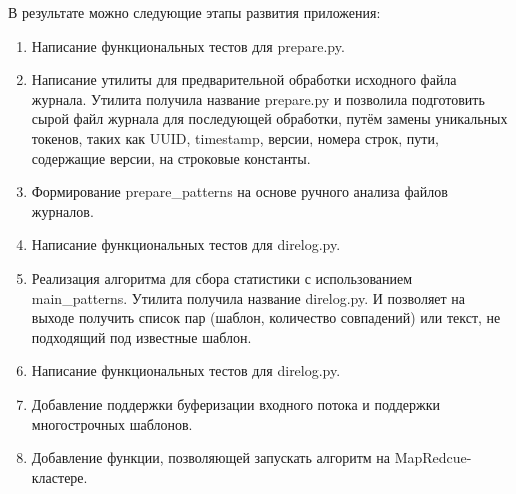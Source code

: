 В результате можно следующие этапы развития приложения:\\

\begin{enumerate}
\item Написание функциональных тестов для prepare.py.
\item Написание утилиты для предварительной обработки исходного файла журнала.
  Утилита получила название prepare.py и позволила подготовить сырой файл
  журнала для последующей обработки, путём замены уникальных токенов, таких
  как UUID, timestamp, версии, номера строк, пути, содержащие версии, на
  строковые константы.
\item Формирование prepare\_patterns на основе ручного анализа
  файлов журналов.
\item Написание функциональных тестов для direlog.py.
\item Реализация алгоритма для сбора статистики с использованием
  main\_patterns. Утилита получила название direlog.py. И позволяет на
  выходе получить список пар (шаблон, количество совпадений) или текст,
  не подходящий под известные шаблон.
\item Написание функциональных тестов для direlog.py.
\item Добавление поддержки буферизации входного потока и поддержки
  многострочных шаблонов.
\item Добавление функции, позволяющей запускать алгоритм на MapRedcue-кластере.
\end{enumerate}

